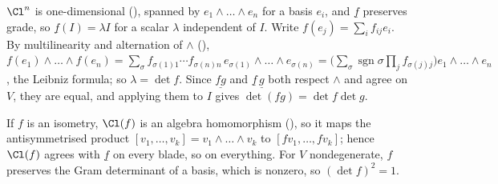 $\Cl^{n}$ is one-dimensional (), spanned by $e_1 \wedge \dots \wedge e_n$ for a basis $e_i$, and $\underline{f}$ preserves grade, so $\underline{f}(I) = \lambda I$ for a scalar $\lambda$ independent of $I$. Write $f(e_j) = \sum_i f_{ij} e_i$. By multilinearity and alternation of $\wedge$ (), $f(e_1) \wedge \dots \wedge f(e_n) = \sum_{\sigma} f_{\sigma(1)1} \cdots f_{\sigma(n)n}\, e_{\sigma(1)} \wedge \dots \wedge e_{\sigma(n)} = \bigl(\sum_\sigma \operatorname{sgn}\sigma \prod_j f_{\sigma(j)j}\bigr) e_1 \wedge \dots \wedge e_n$, the Leibniz formula; so $\lambda = \det f$. Since $\underline{fg}$ and $\underline{f}\,\underline{g}$ both respect $\wedge$ and agree on $V$, they are equal, and applying them to $I$ gives $\det(fg) = \det f \det g$.

If $f$ is an isometry, $\Cl(f)$ is an algebra homomorphism (), so it maps the antisymmetrised product $[v_1, \dots, v_k] = v_1 \wedge \dots \wedge v_k$ to $[f v_1, \dots, f v_k]$; hence $\Cl(f)$ agrees with $\underline{f}$ on every blade, so on everything. For $V$ nondegenerate, $f$ preserves the Gram determinant of a basis, which is nonzero, so $(\det f)^{2} = 1$.

